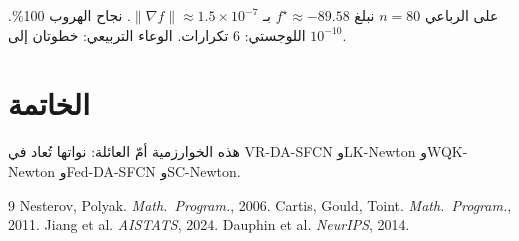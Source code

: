 ﻿\documentclass[12pt,a4paper]{article}
\begin{document}
على الرباعي $n=80$ نبلغ $f^\star\approx -89.58$ بـ $\|\nabla f\|\approx 1.5\times 10^{-7}$.
نجاح الهروب 100\%. اللوجستي: 6 تكرارات. الوعاء التربيعي: خطوتان إلى $10^{-10}$.

\section{الخاتمة}
هذه الخوارزمية أمّ العائلة: نواتها تُعاد في \textenglish{VR-DA-SFCN} و\textenglish{LK-Newton}
و\textenglish{WQK-Newton} و\textenglish{Fed-DA-SFCN} و\textenglish{SC-Newton}.

\begin{english}
\begin{thebibliography}{9}
 Nesterov, Polyak. \textit{Math.\ Program.}, 2006.
 Cartis, Gould, Toint. \textit{Math.\ Program.}, 2011.
 Jiang et al. \textit{AISTATS}, 2024.
 Dauphin et al. \textit{NeurIPS}, 2014.
\end{thebibliography}
\end{english}
\end{document}
